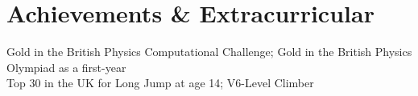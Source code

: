 \section{Achievements \& Extracurricular}
\begin{itemize}[leftmargin=0.15in, label={}]
\small{\item{
    {Gold in the British Physics Computational Challenge; Gold in the British Physics Olympiad as a first-year}\\
    {Top 30 in the UK for Long Jump at age 14; V6-Level Climber}
}}
\end{itemize}